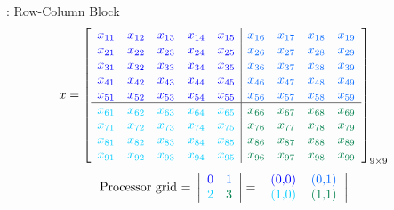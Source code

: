 \begin{frame}
\begin{exampleblock}{: Row-Column Block}
\begin{align*}
x &= \left[
      \begin{array}{lllll|llll}
      \color{g11}x_{11} & \color{g11}x_{12} & \color{g11}x_{13} & 
\color{g11}x_{14} & \color{g11}x_{15} & \color{g12}x_{16} & \color{g12}x_{17} & 
\color{g12}x_{18} & \color{g12}x_{19}\\
      \color{g11}x_{21} & \color{g11}x_{22} & \color{g11}x_{23} & 
\color{g11}x_{24} & \color{g11}x_{25} & \color{g12}x_{26} & \color{g12}x_{27} & 
\color{g12}x_{28} & \color{g12}x_{29}\\
      \color{g11}x_{31} & \color{g11}x_{32} & \color{g11}x_{33} & 
\color{g11}x_{34} & \color{g11}x_{35} & \color{g12}x_{36} & \color{g12}x_{37} & 
\color{g12}x_{38} & \color{g12}x_{39}\\
      \color{g11}x_{41} & \color{g11}x_{42} & \color{g11}x_{43} & 
\color{g11}x_{44} & \color{g11}x_{45} & \color{g12}x_{46} & \color{g12}x_{47} & 
\color{g12}x_{48} & \color{g12}x_{49}\\
      \color{g11}x_{51} & \color{g11}x_{52} & \color{g11}x_{53} & 
\color{g11}x_{54} & \color{g11}x_{55} & \color{g12}x_{56} & \color{g12}x_{57} & 
\color{g12}x_{58} & \color{g12}x_{59}\\\hline
      \color{g13}x_{61} & \color{g13}x_{62} & \color{g13}x_{63} & 
\color{g13}x_{64} & \color{g13}x_{65} & \color{g21}x_{66} & \color{g21}x_{67} & 
\color{g21}x_{68} & \color{g21}x_{69}\\
      \color{g13}x_{71} & \color{g13}x_{72} & \color{g13}x_{73} & 
\color{g13}x_{74} & \color{g13}x_{75} & \color{g21}x_{76} & \color{g21}x_{77} & 
\color{g21}x_{78} & \color{g21}x_{79}\\
      \color{g13}x_{81} & \color{g13}x_{82} & \color{g13}x_{83} & 
\color{g13}x_{84} & \color{g13}x_{85} & \color{g21}x_{86} & \color{g21}x_{87} & 
\color{g21}x_{88} & \color{g21}x_{89}\\
      \color{g13}x_{91} & \color{g13}x_{92} & \color{g13}x_{93} & 
\color{g13}x_{94} & \color{g13}x_{95} & \color{g21}x_{96} & \color{g21}x_{97} & 
\color{g21}x_{98} & \color{g21}x_{99}\\
      \end{array}
\right]_{9\times 9}
\end{align*}
\begin{align*}
\text{Processor grid = }\left|
      \begin{array}{ll}
      \color{g11}0 & \color{g12}1 \\
      \color{g13}2 & \color{g21}3
      \end{array}
\right| &= 
\left|
      \begin{tabular}{lll}
      \color{g11}(0,0) & \color{g12}(0,1) \\
      \color{g13}(1,0) & \color{g21}(1,1) 
      \end{tabular}
\right|
\end{align*}
\end{exampleblock}
\end{frame}



